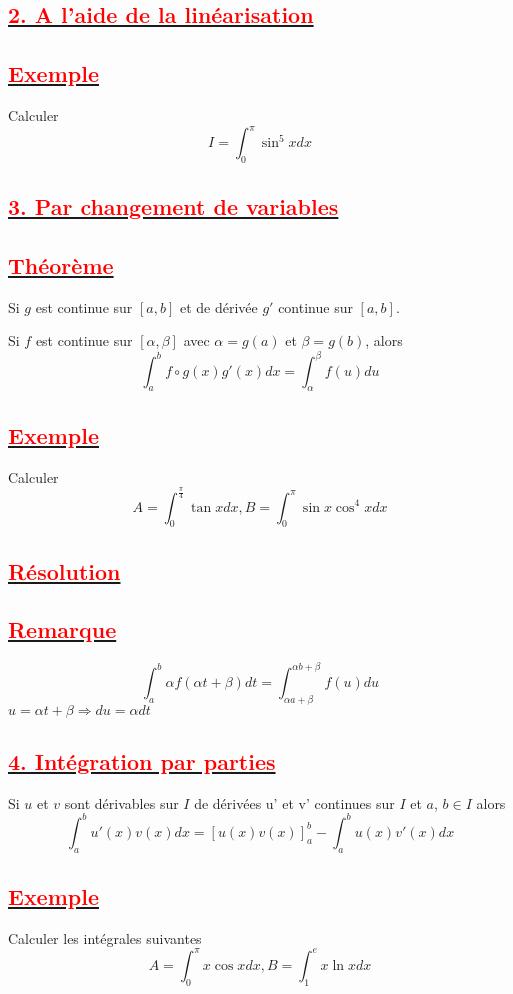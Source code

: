 \documentclass[12pt]{article}
\begin{document}
\subsection*{\underline{\textbf{\textcolor{red}{2. A l'aide de la linéarisation }}}}
\subsection*{\underline{\textbf{\textcolor{red}{Exemple}}}}
Calculer \[I=\int_{0}^{\pi}\sin^{5} x dx \]
\subsection*{\underline{\textbf{\textcolor{red}{3. Par changement de variables}}}}
\subsection*{\underline{\textbf{\textcolor{red}{Théorème}}}}
Si $g$ est continue sur $[a,b]$ et de dérivée $g'$ continue sur $[a,b]$.

Si $f$ est continue sur $[\alpha,\beta]$ avec $\alpha = g(a)$ et $\beta=g(b)$, alors
\[ \int_{a}^{b}f\circ g(x)g'(x)dx=\int_{\alpha}^{\beta}f(u)du \]
\subsection*{\underline{\textbf{\textcolor{red}{Exemple}}}}
Calculer \[A=\int_{0}^{\frac{\pi}{4}}\tan x dx, B=\int_{0}^{\pi}\sin x \cos^{4} x dx\]
\subsection*{\underline{\textbf{\textcolor{red}{Résolution}}}}
\subsection*{\underline{\textbf{\textcolor{red}{Remarque}}}}
\[\int_{a}^{b}\alpha f(\alpha t+\beta)dt=\int_{\alpha a+\beta}^{\alpha b+\beta}f(u)du\]
$u=\alpha t +\beta \Rightarrow du=\alpha dt$
\subsection*{\underline{\textbf{\textcolor{red}{4. Intégration par parties}}}}
Si $u$ et $v$ sont dérivables sur $I$ de dérivées u' et v' continues sur $I$ et $a$, $b \in I$ alors
\[\int_{a}^{b}u'(x)v(x)dx=[u(x)v(x)]_{a}^{b}-\int_{a}^{b}u(x)v'(x)dx\]
\subsection*{\underline{\textbf{\textcolor{red}{Exemple}}}}
Calculer les intégrales suivantes 
\[A=\int_{0}^{\pi}x\cos xdx, B=\int_{1}^{e}x\ln x dx\]
\end{document}
